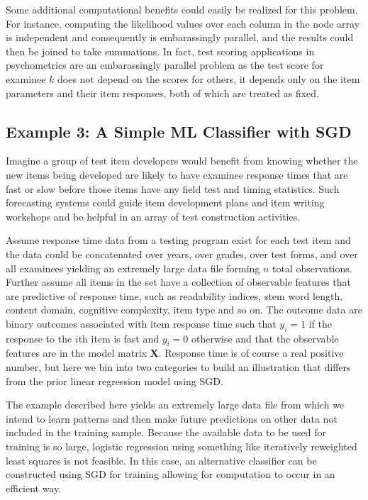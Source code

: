 \documentclass[12pt]{article}
\begin{document}
Some additional computational benefits could easily be realized for this problem. For instance, computing the likelihood values over each column in the node array is independent and consequently is embarassingly parallel, and the results could then be joined to take summations. In fact, test scoring applications in psychometrics are an embarassingly parallel problem as the test score for examinee $k$ does not depend on the scores for others, it depends only on the item parameters and their item responses, both of which are treated as fixed. 

\subsection*{Example 3: A Simple ML Classifier with SGD}

Imagine a group of test item developers would benefit from knowing whether the new items being developed are likely to have examinee response times that are fast or slow before those items have any field test and timing statistics. Such forecasting systems could guide item development plans and item writing workshops and be helpful in an array of test construction activities. 

Assume response time data from a testing program exist for each test item and the data could be concatenated over years, over grades, over test forms, and over all examinees yielding an extremely large data file forming $n$ total observations. Further assume all items in the set have a collection of observable features that are predictive of response time, such as readability indices, stem word length, content domain, cognitive complexity, item type and so on. The outcome data are binary outcomes associated with item response time such that $y_{i} = 1$ if the response to the $i$th item is fast and $y_{i}=0$ otherwise and that the observable features are in the model matrix $\bm{X}$. Response time is of course a real positive number, but here we bin into two categories to build an illustration that differs from the prior linear regression model using SGD.   

The example described here yields an extremely large data file from which we intend to learn patterns and then make future predictions on other data not included in the training sample. Because the available data to be used for training is so large, logistic regression using something like iteratively reweighted least squares is not feasible. In this case, an alternative classifier can be constructed using SGD for training allowing for computation to occur in an efficient way. 
\end{document}
